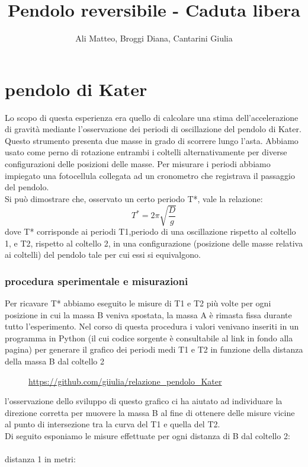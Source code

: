 \documentclass[a4paper]{article}
\title{Pendolo reversibile - Caduta libera}
\author{Ali Matteo, Broggi Diana, Cantarini Giulia}
\date{ }
\theoremstyle{definition}
\begin{document}
	\maketitle
	\section*{pendolo di Kater}
	Lo scopo di questa esperienza era quello di calcolare una stima dell'accelerazione di gravità mediante l'osservazione dei periodi di oscillazione del pendolo di Kater. Questo strumento presenta due masse in grado di scorrere lungo l'asta. Abbiamo usato come perno di rotazione entrambi i coltelli alternativamente per diverse configurazioni delle posizioni delle masse. Per misurare i periodi abbiamo impiegato una fotocellula collegata ad un cronometro che registrava il passaggio del pendolo.\\
	Si può dimostrare che, osservato un certo periodo T*, vale la relazione:
	\[T^{*} = 2\pi \sqrt{\frac{D}{g}}\] dove T* corrisponde ai periodi T1,periodo di una oscillazione rispetto al coltello 1, e T2, rispetto al coltello 2, in una configurazione (posizione delle masse relativa ai coltelli) del pendolo tale per cui essi si equivalgono. 
	\subsubsection*{procedura sperimentale e misurazioni}
	Per ricavare T* abbiamo eseguito le misure di T1 e T2 più volte per ogni posizione in cui la massa B veniva spostata, la massa A è rimasta fissa durante tutto l'esperimento. Nel corso di questa procedura i valori venivano inseriti in un programma in Python (il cui codice sorgente è consultabile al link in fondo alla pagina) per generare il grafico dei periodi medi T1 e T2 in funzione della distanza della massa B dal coltello 2
	\begin{figure}[!ht]
		\captionsetup{labelformat=empty}
		\caption{\url{https://github.com/giiulia/relazione_pendolo_Kater}}
	\end{figure}

\noindent l'osservazione dello sviluppo di questo grafico ci ha aiutato ad individuare la direzione corretta per muovere la massa B al fine di ottenere delle misure vicine al punto di intersezione tra la curva del T1 e quella del T2.\\
Di seguito esponiamo le misure effettuate per ogni distanza di B dal coltello 2:\\\\
distanza 1 in metri:
\begin{table}[!ht]
	\centering
%	
\end{table}
\end{document}
